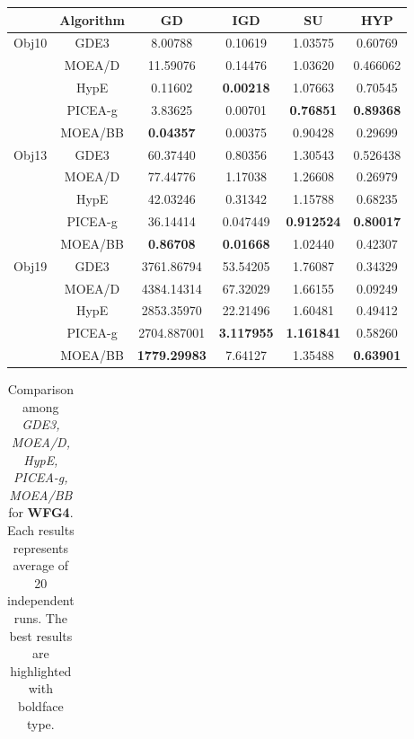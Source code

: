 \begin{center}
\begin{table}[!h]
\begin{tabular}{| c | c | c | c | c | c |}
\hline
&\textbf{Algorithm}	&\textbf{GD}&\textbf{IGD}&\textbf{SU}&\textbf{HYP}\\\hline
Obj10	&GDE3		&8.00788				&0.10619			&1.03575			&0.60769\\\cline{2-6}
		&MOEA/D		&11.59076				&0.14476			&1.03620			&0.466062\\\cline{2-6}
		&HypE		&0.11602				&\textbf{0.00218}	&1.07663			&0.70545\\\cline{2-6}
		&PICEA-g	&3.83625				&0.00701			&\textbf{0.76851}	&\textbf{0.89368}\\\cline{2-6}
		&MOEA/BB	&\textbf{0.04357}		&0.00375			&0.90428			&0.29699\\\hline
		
Obj13	&GDE3		&60.37440				&0.80356			&1.30543			&0.526438\\\cline{2-6}
		&MOEA/D		&77.44776				&1.17038			&1.26608			&0.26979\\\cline{2-6}
		&HypE		&42.03246				&0.31342			&1.15788			&0.68235\\\cline{2-6}
		&PICEA-g	&36.14414				&0.047449			&\textbf{0.912524}	&\textbf{0.80017}\\\cline{2-6}
		&MOEA/BB	&\textbf{0.86708}		&\textbf{0.01668}	&1.02440			&0.42307\\\hline					
		
Obj19	&GDE3		&3761.86794			&53.54205			&1.76087			&0.34329\\\cline{2-6}
		&MOEA/D		&4384.14314				&67.32029			&1.66155			&0.09249\\\cline{2-6}
		&HypE		&2853.35970			&22.21496			&1.60481			&0.49412\\\cline{2-6}
		&PICEA-g	&2704.887001			&\textbf{3.117955}	&\textbf{1.161841}	&0.58260\\\cline{2-6}
		&MOEA/BB	&\textbf{1779.29983}	&7.64127			&1.35488			&\textbf{0.63901}\\\hline
\end{tabular}

\label{tab:wfg3}

\end{table}
\begin{table}[!h]
\caption{Comparison among \textit{GDE3, MOEA/D, HypE, PICEA-g, MOEA/BB} for \textbf{WFG4}. Each results represents average of 20 independent runs. The best results are highlighted with boldface type.}
\begin{tabular}{| c | c | c | c | c | c |}


\end{tabular}
\end{table}
\end{center}
